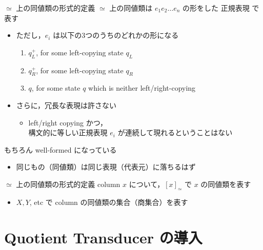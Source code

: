 \documentclass[presentation, xetex]{beamer}
\begin{document}
\begin{frame}[label={sec:org84a8a12}]{\(\simeq\) 上の同値類の形式的定義}
\(\simeq\) 上の同値類は \(e_1 e_2 \dots e_n\) の形をした \alert{\alert{正規表現}} で表す
\begin{itemize}
\item ただし，\(e_i\) は以下の3つのうちのどれかの形になる

\begin{enumerate}
\item \(q_L^+\), for some left-copying state \(q_L\)

\item \(q_R^+\), for some left-copying state \(q_R\)

\item \(q\), for some state \(q\) which is neither left/right-copying
\end{enumerate}
\end{itemize}


\begin{itemize}
\item さらに，冗長な表現は許さない
\begin{itemize}
\item left/right copying かつ，\\
構文的に等しい正規表現 \(e_i\) が連続して現れるということはない
\end{itemize}
\end{itemize}


もちろん well-formed になっている
\begin{itemize}
\item 同じもの（同値類）は同じ表現（代表元）に落ちるはず
\end{itemize}
\end{frame}



\begin{frame}[label={sec:org15b2ec4}]{\(\simeq\) 上の同値類の形式的定義}
column \(x\) について，\([x]_\simeq\) で \(x\) の同値類を表す
\begin{itemize}
\item \(X, Y\), etc で column の同値類の集合（商集合）を表す
\end{itemize}
\end{frame}



\section{Quotient Transducer の導入}
\label{sec:org32cc1a9}
\end{document}
